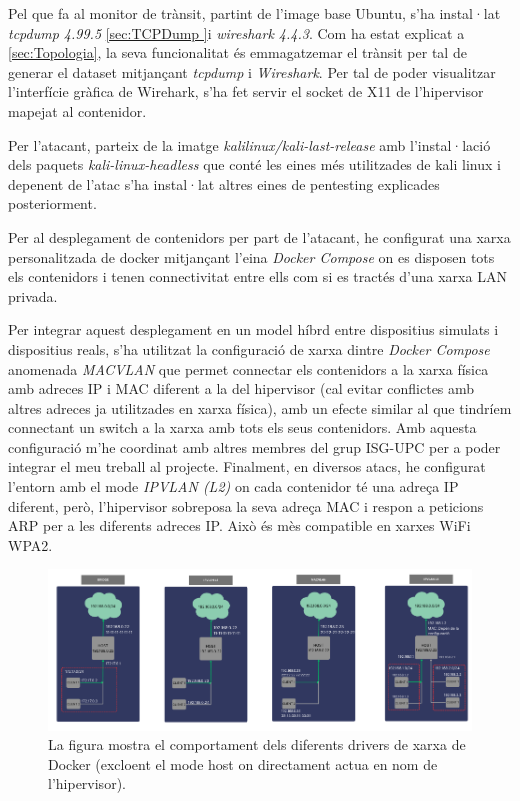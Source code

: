 Pel que fa al monitor de trànsit, partint de l’image base Ubuntu, s’ha instal·lat \textit{tcpdump 4.99.5} \ref{sec:TCPDump }i \textit{wireshark 4.4.3}. Com ha estat explicat a \ref{sec:Topologia}, la seva funcionalitat és emmagatzemar el trànsit per tal de generar el dataset mitjançant \textit{tcpdump} i \textit{Wireshark}. Per tal de poder visualitzar l'interfície gràfica de Wirehark, s’ha fet servir el socket de X11 de l’hipervisor mapejat al contenidor.

Per l’atacant, parteix de la imatge \textit{kalilinux/kali-last-release} \cite{kaliimg} amb l’instal·lació dels paquets \textit{kali-linux-headless} que conté les eines més utilitzades de kali linux i depenent de l’atac s’ha instal·lat altres eines de pentesting explicades posteriorment.

Per al desplegament de contenidors per part de l'atacant, he configurat una xarxa personalitzada de docker mitjançant l'eina \textit{Docker Compose} on es disposen tots els contenidors i tenen connectivitat entre ells com si es tractés d'una xarxa LAN privada. 

Per integrar aquest desplegament en un model híbrd entre dispositius simulats i dispositius reals, s’ha utilitzat la configuració de xarxa dintre \textit{Docker Compose} anomenada \textit{MACVLAN} que permet connectar els contenidors a la xarxa física amb adreces IP i MAC diferent a la del hipervisor (cal evitar conflictes amb altres adreces ja utilitzades en xarxa física), amb un efecte similar al que tindríem connectant un switch a la xarxa amb tots els seus contenidors. Amb aquesta configuració m'he coordinat amb altres membres del grup ISG-UPC per a poder integrar el meu treball al projecte. 
Finalment, en diversos atacs, he configurat l'entorn amb el mode \textit{IPVLAN (L2)} on cada contenidor té una adreça IP diferent, però, l'hipervisor sobreposa la seva adreça MAC i respon a peticions ARP per a les diferents adreces IP. Això és mès compatible en xarxes WiFi WPA2.

 \begin{figure}[H]
    \centering
    \includegraphics[width=1\textwidth]{img/DockerNetworks.png}
    \caption{La figura mostra el comportament dels diferents drivers de xarxa de Docker (excloent el mode host on directament actua en nom de l'hipervisor).}
    \label{fig:DockerNetworks}
  \end{figure}

